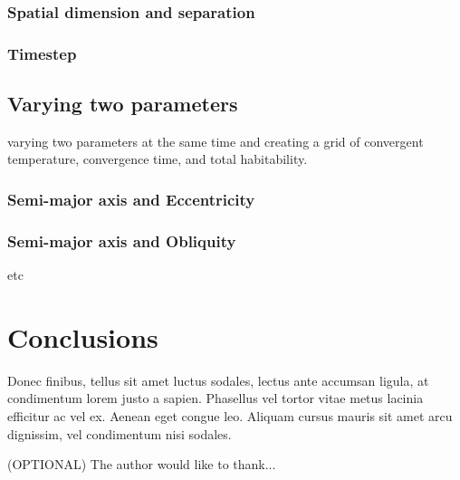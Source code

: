 \documentclass[12pt, onecolumn]{revtex4-2}    %
\begin{document}
\subsubsection*{Spatial dimension and separation}

\subsubsection*{Timestep}

\subsection{Varying two parameters} \label{sec:two_param}

varying two parameters at the same time and creating a grid of convergent temperature, convergence time, and total habitability.

\subsubsection*{Semi-major axis and Eccentricity}

\subsubsection*{Semi-major axis and Obliquity}

etc

\section{Conclusions} \label{sec:conclusion}

Donec finibus, tellus sit amet luctus sodales, lectus ante accumsan ligula, at condimentum lorem justo a sapien. Phasellus vel tortor vitae metus lacinia efficitur ac vel ex. Aenean eget congue leo. Aliquam cursus mauris sit amet arcu dignissim, vel condimentum nisi sodales.

\begin{acknowledgments}
    (OPTIONAL) The author would like to thank...
\end{acknowledgments}
\end{document}
